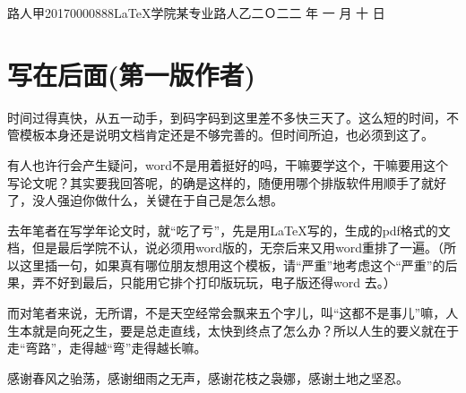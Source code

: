 \documentclass[a4paper]{nuist}
\begin{document}
{路人甲}{20170000888}{\LaTeX 学院}{某专业}{路人乙}{二Ｏ二二\hspace{0.4em} 年\hspace{0.4em} 一\hspace{0.4em} 月\hspace{0.4em} 十\hspace{0.4em} 日}










\section{写在后面(第一版作者)}

时间过得真快，从五一动手，到码字码到这里差不多快三天了。这么短的时间，不管模板本身还是说明文档肯定还是不够完善的。但时间所迫，也必须到这了。

有人也许行会产生疑问，word不是用着挺好的吗，干嘛要学这个，干嘛要用这个写论文呢？其实要我回答呢，的确是这样的，随便用哪个排版软件用顺手了就好了，没人强迫你做什么，关键在于自己是怎么想。

去年笔者在写学年论文时，就“吃了亏”，先是用\LaTeX 写的，生成的pdf格式的文档，但是最后学院不认，说必须用word版的，无奈后来又用word重排了一遍。（所以这里插一句，如果真有哪位朋友想用这个模板，请“严重”地考虑这个“严重”的后果，弄不好到最后，只能用它排个打印版玩玩，电子版还得word 去。）

而对笔者来说，无所谓，不是天空经常会飘来五个字儿，叫“这都不是事儿”嘛，人生本就是向死之生，要是总走直线，太快到终点了怎么办？所以人生的要义就在于走“弯路”，走得越“弯”走得越长嘛。








\thanking
{
    感谢春风之骀荡，感谢细雨之无声，感谢花枝之袅娜，感谢土地之坚忍。

    \vspace{5em}
    {\color{red}
    }
}
\end{document}

